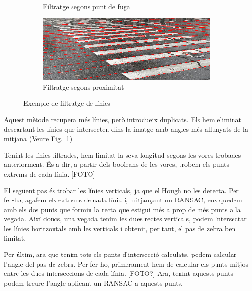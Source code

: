 \documentclass[10pt,a4paper,twocolumn,twoside]{article}
\begin{document}
\begin{figure}[h]
\begin{subfigure}{0.45\columnwidth}
		\caption{Filtratge segons punt de fuga}
	\end{subfigure}
	\quad
	\begin{subfigure}{0.45\columnwidth}
		\includegraphics[width=\linewidth]{figs/filtrat_proximitat}
		\caption{Filtratge segons proximitat}
	\end{subfigure}
	\caption{Exemple de filtratge de línies}
	\label{fig:vores}
\end{figure}
\noindent
Aquest mètode recupera més línies, però introdueix duplicats. Els hem eliminat descartant les línies que intersecten dins la imatge amb angles més allunyats de la mitjana (Veure Fig.~\ref{fig:vores})

Tenint les línies filtrades, hem limitat la seva longitud segons les vores trobades anteriorment. És a dir, a partir dels booleans de les vores, trobem els punts extrems de cada línia. [FOTO]

El següent pas és trobar les línies verticals, ja que el Hough no les detecta. Per fer-ho, agafem els extrems de cada línia i, mitjançant un RANSAC, ens quedem amb els dos punts que formin la recta que estigui més a prop de més punts a la vegada. Així doncs, una vegada tenim les dues rectes verticals, podem intersectar les línies horitzontals amb les verticals i obtenir, per tant, el pas de zebra ben limitat.

Per últim, ara que tenim tots els punts d'intersecció calculats, podem calcular l'angle del pas de zebra. Per fer-ho, primerament hem de calcular els punts mitjos entre les dues interseccions de cada línia. [FOTO?] Ara, tenint aquests punts, podem treure l'angle aplicant un RANSAC a aquests punts.


\end{document}
